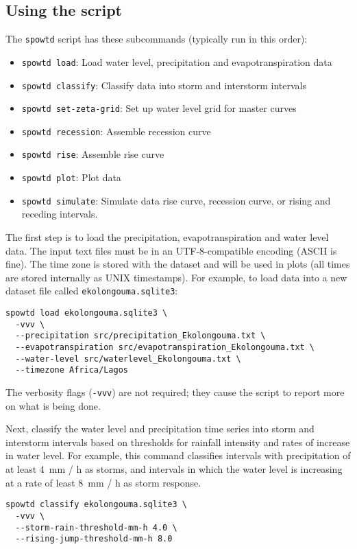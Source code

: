 \documentclass[11pt,a4paper]{article}
\begin{document}
\subsection{Using the script}
The \texttt{spowtd} script has these subcommands (typically run in
this order):
\begin{itemize}
\item \texttt{spowtd load}: Load water level, precipitation and
  evapotranspiration data
\item \texttt{spowtd classify}: Classify data into storm and
  interstorm intervals
\item \texttt{spowtd set-zeta-grid}: Set up water level grid for
  master curves
\item \texttt{spowtd recession}: Assemble recession curve
\item \texttt{spowtd rise}: Assemble rise curve
\item \texttt{spowtd plot}: Plot data
\item \texttt{spowtd simulate}: Simulate data rise curve, recession
  curve, or rising and receding intervals.
\end{itemize}

The first step is to load the precipitation, evapotranspiration and
water level data.  The input text files must be in an UTF-8-compatible
encoding (ASCII is fine).  The time zone is stored with the dataset
and will be used in plots (all times are stored internally as UNIX
timestamps).  For example, to load data into a new dataset file called
\texttt{ekolongouma.sqlite3}:
\begin{lstlisting}[frame=single]
spowtd load ekolongouma.sqlite3 \
  -vvv \
  --precipitation src/precipitation_Ekolongouma.txt \
  --evapotranspiration src/evapotranspiration_Ekolongouma.txt \
  --water-level src/waterlevel_Ekolongouma.txt \
  --timezone Africa/Lagos
\end{lstlisting}
The verbosity flags (\texttt{-vvv}) are not required; they cause the
script to report more on what is being done.

Next, classify the water level and precipitation time series into
storm and interstorm intervals based on thresholds for rainfall
intensity and rates of increase in water level.  For example, this
command classifies intervals with precipitation of at least 4~mm / h
as storms, and intervals in which the water level is increasing at a
rate of least 8~mm / h as storm response.
\begin{lstlisting}[frame=single]
spowtd classify ekolongouma.sqlite3 \
  -vvv \
  --storm-rain-threshold-mm-h 4.0 \
  --rising-jump-threshold-mm-h 8.0
\end{lstlisting}
\end{document}
